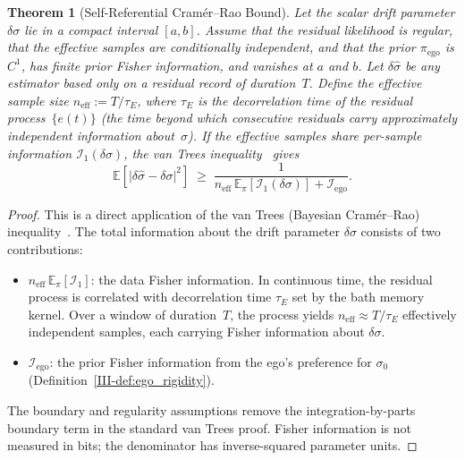 \documentclass[12pt,a4paper,openany]{book}
\newtheorem{theorem}{Theorem}[chapter]
\begin{document}
\begin{theorem}[Self-Referential Cram\'{e}r--Rao Bound]
\label{III-thm:SRCR}
Let the scalar drift parameter $\delta\sigma$ lie in a compact interval
$[a,b]$.  Assume that the residual likelihood is regular, that the
effective samples are conditionally independent, and that the prior
$\pi_{\mathrm{ego}}$ is $C^1$, has finite prior Fisher information,
and vanishes at $a$ and $b$.  Let $\delta\hat\sigma$ be any estimator
based only on a residual record of duration~$T$.
Define the \emph{effective sample size}
$n_{\mathrm{eff}} := T/\tau_E$, where $\tau_E$ is the
decorrelation time of the residual process~$\{e(t)\}$
(the time beyond which consecutive residuals carry
approximately independent information about~$\sigma$).
If the effective samples share per-sample information
$\mathcal I_1(\delta\sigma)$, the van Trees
inequality~\cite{vanTrees1968} gives
\begin{equation}
\label{III-eq:SRCR}
\mathbb{E}\!\left[
  \bigl|\delta\hat{\sigma} - \delta\sigma\bigr|^2
\right]
\;\geq\; \frac{1}{
  n_{\mathrm{eff}}\,\mathbb E_{\pi}[\mathcal I_1(\delta\sigma)]
  + \mathcal{I}_{\mathrm{ego}}}.
\end{equation}
\end{theorem}

\begin{proof}
This is a direct application of the van Trees
(Bayesian Cram\'{e}r--Rao)
inequality~\cite{vanTrees1968}.
The total information about the drift parameter $\delta\sigma$
consists of two contributions:
\begin{itemize}
\item $n_{\mathrm{eff}}\,\mathbb E_\pi[\mathcal I_1]$: the data
  Fisher information.  In continuous time, the residual
  process is correlated with decorrelation time $\tau_E$
  set by the bath memory kernel.
  Over a window of duration~$T$, the process yields
  $n_{\mathrm{eff}} \approx T/\tau_E$ effectively
  independent samples, each carrying Fisher information
  about $\delta\sigma$.
\item $\mathcal{I}_{\mathrm{ego}}$: the prior Fisher
  information from the ego's preference for $\sigma_0$
  (Definition~\ref{III-def:ego_rigidity}).
\end{itemize}
The boundary and regularity assumptions remove the
integration-by-parts boundary term in the standard van Trees proof.
Fisher information is not measured in bits; the denominator has
inverse-squared parameter units.
\end{proof}
\end{document}
